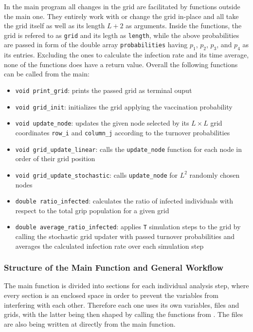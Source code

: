 In the main program all changes in the grid are facilitated by functions outside the main one. They entirely work with or change the grid in-place and all take the grid itself as well as its length $L+2$ as arguments.
Inside the functions, the grid is refered to as \texttt{grid} and its legth as \texttt{length}, while the above probabilities are passed in form of the double array \texttt{probabilities} having $p_1$, $p_2$, $p_3$, 
and $p_4$ as its entries. Excluding the ones to calculate the infection rate and its time average, none of the functions does have a return value. Overall the following functions can be called from the main:
\begin{itemize}
    \item \texttt{void print\_grid}: prints the passed grid as terminal ouput
    \item \texttt{void grid\_init}: initializes the grid applying the vaccination probability
    \item \texttt{void update\_node}: updates the given node selected by its $L\times L$ grid coordinates \texttt{row\_i} and \texttt{column\_j} according to the turnover probabilities
    \item \texttt{void grid\_update\_linear}: calls the \texttt{update\_node} function for each node in order of their grid position
    \item \texttt{void grid\_update\_stochastic}: calls \texttt{update\_node} for $L^2$ randomly chosen nodes
    \item \texttt{double ratio\_infected}: calculates the ratio of infected individuals with respect to the total grip population for a given grid
    \item \texttt{double average\_ratio\_infected}: applies \texttt{T} simulation steps to the grid by calling the stochastic grid updater with passed turnover probabilities 
    and averages the calculated infection rate over each simulation step
\end{itemize}


\subsubsection{Structure of the Main Function and General Workflow}

The main function is divided into sections for each individual analysis step, where every section is an enclosed space in order to prevent the variables from interfering with each other.
Therefore each one uses its own variables, files and grids, with the latter being then shaped by calling the functions from . The files are also being written at
directly from the main function.

